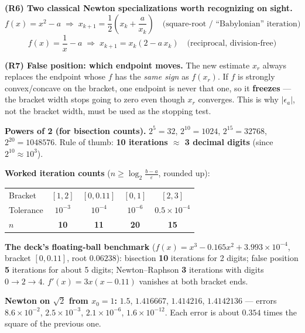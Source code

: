 \begin{derivedbox}
\smallskip
\textbf{(R6) Two classical Newton specializations worth recognizing on sight.}
\[
f(x)=x^2-a \;\Rightarrow\; x_{k+1} = \frac12\left(x_k + \frac{a}{x_k}\right)
\quad\text{(square-root / ``Babylonian'' iteration)}
\]
\[
f(x)=\frac1x-a \;\Rightarrow\; x_{k+1} = x_k(2-a\,x_k)
\quad\text{(reciprocal, division-free)}
\]

\smallskip
\textbf{(R7) False position: which endpoint moves.} The new estimate $x_r$ always replaces the endpoint whose $f$ has the \emph{same sign} as $f(x_r)$. If $f$ is strongly convex/concave on the bracket, one endpoint is never that one, so it \textbf{freezes} --- the bracket width stops going to zero even though $x_r$ converges. This is why $|\epsilon_a|$, not the bracket width, must be used as the stopping test.
\end{derivedbox}

\begin{numbox}
\textbf{Powers of 2 (for bisection counts).} $2^5=32$, $2^{10}=1024$, $2^{15}=32768$, $2^{20}=1048576$. Rule of thumb: \textbf{10 iterations $\approx$ 3 decimal digits} (since $2^{10}\approx10^3$).

\smallskip
\textbf{Worked iteration counts} ($n \ge \log_2\frac{b-a}{\varepsilon}$, rounded up):
\begin{center}\small
\begin{tabular}{@{}lcccc@{}}
\toprule
Bracket & $[1,2]$ & $[0,0.11]$ & $[0,1]$ & $[2,3]$\\
Tolerance & $10^{-3}$ & $10^{-4}$ & $10^{-6}$ & $0.5\times10^{-4}$\\
\midrule
$n$ & \textbf{10} & \textbf{11} & \textbf{20} & \textbf{15}\\
\bottomrule
\end{tabular}
\end{center}

\smallskip
\textbf{The deck's floating-ball benchmark} ($f(x)=x^3-0.165x^2+3.993\times10^{-4}$, bracket $[0,0.11]$, root $0.06238$):
bisection \textbf{10} iterations for 2 digits; false position \textbf{5} iterations for about 5 digits; Newton--Raphson \textbf{3} iterations with digits $0\to2\to4$. $f'(x)=3x(x-0.11)$ vanishes at both bracket ends.

\smallskip
\textbf{Newton on $\sqrt2$ from $x_0=1$:} $1.5$, $1.416667$, $1.414216$, $1.4142136$ --- errors $8.6\times10^{-2}$, $2.5\times10^{-3}$, $2.1\times10^{-6}$, $1.6\times10^{-12}$. Each error is about $0.354$ times the square of the previous one.
\end{numbox}

